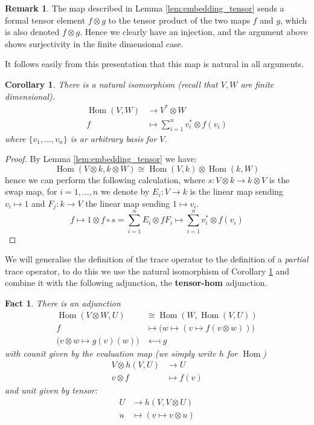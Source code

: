 \documentclass[12pt]{article}
\theoremstyle{plain}
\newtheorem{fact}[thm]{Fact}
\newtheorem{cor}[thm]{Corollary}
\theoremstyle{definition}
\newtheorem{remark}[thm]{Remark}
\newcommand{\lto}{\longrightarrow}
\begin{document}
\begin{remark}
	The map described in Lemma \ref{lem:embedding_tensor} sends a formal tensor element $f \otimes g$ to the tensor product of the two maps $f$ and $g$, which is also denoted $f \otimes g$. Hence we clearly have an injection, and the argument above shows surjectivity in the finite dimensional case.
	
	It follows easily from this presentation that this map is natural in all arguments.
\end{remark}
	\begin{cor}\label{cor:hom_dual}
		There is a natural isomorphism (recall that $V,W$ are finite dimensional).
		\begin{align}
			\operatorname{Hom}(V,W) &\lto V^\ast \otimes W\\
			f &\longmapsto \sum_{i = 1}^n v_i^\ast \otimes f(v_i)
				\end{align}
			where $\lbrace v_1,..., v_n\rbrace$ is ar arbitrary basis for $V$.
	\end{cor}
	\begin{proof}
		By Lemma \ref{lem:embedding_tensor} we have:
		\begin{equation}
			\operatorname{Hom}(V \otimes k, k\otimes W) \cong \operatorname{Hom}(V, k) \otimes \operatorname{Hom}(k, W)
		\end{equation}
	hence we can perform the following calculation, where $s: V \otimes k \lto k \otimes V$ is the swap map, for $i=1,...,n$ we denote by $E_{i}: V \lto k$ is the linear map sending $v_i \longmapsto 1$ and $F_{j}: k \lto V$ the linear map sending $1 \longmapsto v_i$.
	\begin{equation}
		f \longmapsto 1 \otimes f \circ s = \sum_{i = 1}^n E_{i} \otimes f F_{i} \longmapsto \sum_{i = 1}^n v_i^\ast \otimes f(v_i)
	\end{equation}
	\end{proof}
	We will generalise the definition of the trace operator to the definition of a \emph{partial} trace operator, to do this we use the natural isomorphism of Corollary \ref{cor:hom_dual} and combine it with the following adjunction, the \textbf{tensor-hom} adjunction.
	\begin{fact}
		There is an adjunction
		\begin{align}
			\operatorname{Hom}(V \otimes W, U) &\cong \operatorname{Hom}(W, \operatorname{Hom}(V,U))\\
			f &\longmapsto \big(w \mapsto (v \mapsto f(v\otimes w))\big)\\
			\big(v \otimes w \mapsto g(v)(w) \big) &\longmapsfrom g
		\end{align}
		with counit given by the evaluation map (we simply write $h$ for $\operatorname{Hom}$)
		\begin{align*}
			V \otimes h(V,U) &\lto U\\
			v \otimes f &\longmapsto f(v)
		\end{align*}
		and unit given by tensor:
		\begin{align*}
			U &\lto h(V,V \otimes U)\\
			u &\longmapsto (v \mapsto v \otimes u)
		\end{align*}
	\end{fact}
\end{document}
